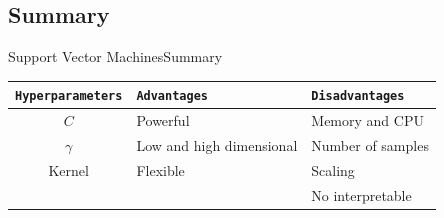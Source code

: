 \documentclass[10pt,compress]{beamer} %
\begin{document}
\subsection{Summary}
\begin{frame}{Support Vector Machines}{Summary}
	\begin{center}
	\begin{tabular}{cp{3cm}p{3cm}}\hline
	 	\texttt{Hyperparameters}  & \texttt{Advantages}  & \texttt{Disadvantages} \\\hline
	 	$C$                       & Powerful             & Memory and CPU  \\
	 	$\gamma$                  & Low and high dimensional & Number of samples   \\
	 	Kernel                    & Flexible             & Scaling  \\
	 	                          &                      & No interpretable  \\
	 	\hline
	\end{tabular}
	\end{center}
\end{frame}





\end{document}
